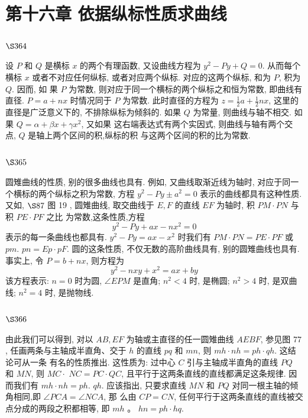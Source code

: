 \chapter{第十六章 依据纵标性质求曲线}

\section{$\S 364$}

设 $P$ 和 $Q$ 是横标 $x$ 的两个有理函数, 又设曲线方程为 $y^{2}-P y+Q=0$. 从而每个横标 $x$ 或者不对应任何纵标, 或者对应两个纵标. 对应的这两个纵标, 和为 $P$, 积为 $Q$. 因而, 如 果 $P$ 为常数, 则对应于同一个横标的两个纵标之和恒为常数, 即曲线有直径. $P=a+n x$ 时情况同于 $P$ 为常数. 此时直径的方程为 $z=\frac{1}{2} a+\frac{1}{2} n x$, 这里的直径是广泛意义下的, 不排除纵标为倾斜的. 如果 $Q$ 为常量, 则曲线与轴不相交. 如果 $Q=\alpha+\beta x+\gamma x^{2}$, 又如果 这右端表达式有两个实因式, 则曲线与轴有两个交点, $Q$ 是轴上两个区间的积,纵标的积 与这两个区间的积的比为常数.

\section{$\S 365$}

圆雉曲线的性质, 别的很多曲线也具有. 例如, 又曲线取渐近线为轴时, 对应于同一 个横标的两个纵标之积为常数, 方程 $y^{2}-P y \pm a^{2}=0$ 表示的曲线都具有这种性质. 又如, $\S 87$ 图 19 , 圆雉曲线, 取交曲线于 $E, F$ 的直线 $E F$ 为轴时, 积 $P M \cdot P N$ 与积 $P E \cdot P F$ 之比 为常数,这条性质,方程
\[
y^{2}-P y+a x-n x^{2}=0
\]
表示的每一条曲线也都具有. $y^{2}-P y=a x-x^{2}$ 时我们有 $P M \cdot P N=P E \cdot P F$ 或 $p m$. $p n=E p \cdot p F$. 圆的这条性质, 不仅无数的高阶曲线具有, 别的圆雉曲线也具有. 事实上, 令 $P=b+n x$, 则方程为
\[
y^{2}-n x y+x^{2}=a x+b y
\]
该方程表示: $n=0$ 时为圆, $\angle E P M$ 是直角; $n^{2}<4$ 时, 是椭圆; $n^{2}>4$ 时, 是双曲线; $n^{2}=4$ 时, 是抛物线.

\section{$\S 366$}
由此我们可以得到, 对以 $A B, E F$ 为轴或主直径的任一圆雉曲线 $A E B F$, 参见图 77 , 任画两条与主轴成半直角、交于 $h$ 的直线 $p q$ 和 $m n$, 则 $m h \cdot n h=p h \cdot q h$. 这结论可从一条 有名的性质推出. 这性质为: 过中心 $C$ 引与主轴成半直角的直线 $P Q$ 和 $M N$, 则 $M C \cdot$ $N C=P C \cdot Q C$, 且平行于这两条直线的直线都满足这条规律. 因而我们有 $m h \cdot n h=p h$. $q h$. 应该指出, 只要求直线 $M N$ 和 $P Q$ 对同一根主轴的倾角相同,即 $\angle P C A=\angle N C A$, 那 么由 $C P=C N$, 任何平行于这两条直线的直线被交点分成的两段之积都相等, 即 $m h$ 。 $h n=p h \cdot h q$.


